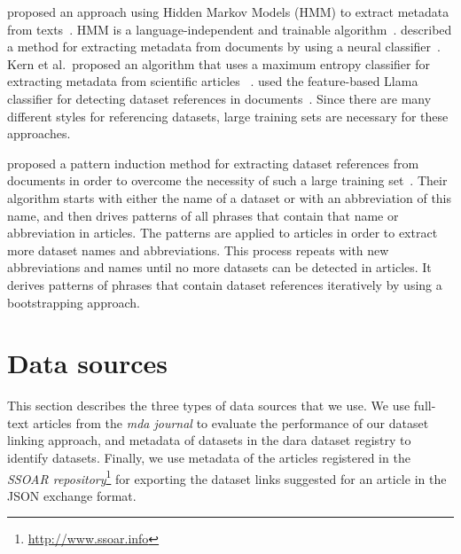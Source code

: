 \documentclass{IOS-Book-Article}
\newcommand{\dara}{\textsf{da\textbar ra}}
\begin{document}
\citeauthor{Cui2010} proposed an approach using Hidden Markov Models (HMM) to extract metadata from texts~\cite{Cui2010}. 
HMM is a language-independent and trainable algorithm~\cite{Kubala1998}.
\citeauthor{Marinai2009} described a method for extracting metadata from documents by using a neural classifier~\cite{Marinai2009}.
Kern et al.\ proposed an algorithm that uses a maximum entropy classifier for extracting metadata from scientific articles~
\cite{Kern2012}.
\citeauthor{MeiyuLu2012} used the feature-based Llama classifier for detecting dataset references in documents~\cite{MeiyuLu2012}.
Since there are many different styles for referencing datasets, large training sets are necessary for these approaches.

\citeauthor{Boland2012} proposed a pattern induction method for extracting dataset references from documents in order to overcome the necessity of such a large training set~\cite{Boland2012}.
Their algorithm starts with either the name of a dataset or with an abbreviation of this name, and then drives patterns of all phrases that contain that name or abbreviation in articles.
The patterns are applied to articles in order to extract more dataset names and abbreviations.
This process repeats with new abbreviations and names until no more datasets can be detected in articles.
It derives patterns of phrases that contain dataset references iteratively by using a bootstrapping approach.


\section{Data sources}
\label{sec:data}
This section describes the three types of data sources that we use. 
We use full-text articles from the \emph{mda journal} to evaluate the performance of our dataset linking approach, and metadata of datasets in the {\dara} dataset registry to identify datasets. 
Finally, we use metadata of the articles registered in the \emph{SSOAR repository}\footnote{\url{http://www.ssoar.info}} for exporting the dataset links suggested for an article in the JSON exchange format.
 
\end{document}
